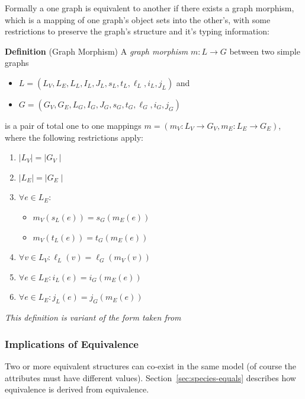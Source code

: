 \documentclass{cekarticle}
\begin{document}
Formally a one graph is equivalent to another if there exists a
graph morphism, which is a mapping of one graph's object sets into
the other's, with some restrictions to preserve the graph's
structure and it's typing information:

\textbf{Definition} (Graph Morphism) A \emph{graph morphism} $m : L \rightarrow G$ between two
simple graphs
\begin{itemize}
\item $L = (L_{V}, L_{E}, L_{L}, I_{L}, J_{L}, s_{L}, t_{L}, \ell_{L}, i_{L}, j_{L})$ and
\item $G = (G_{V}, G_{E}, L_{G}, I_{G}, J_{G}, s_{G}, t_{G}, \ell_{G}, i_{G}, j_{G})$
\end{itemize}
is a pair of total one to one mappings $m = (m_{V} : L_{V}
\rightarrow G_{V}, m_{E} : L_{E} \rightarrow G_{E})$, where the
following restrictions apply:

\begin{enumerate}
\item $\mid L_{V} \mid = \mid G_{V} \mid$

\item $\mid L_{E} \mid = \mid G_{E} \mid$

\item $\forall e \in L_{E} : $
    \begin{itemize}
    \item $m_{V}(s_{L}(e))= s_{G}(m_{E}(e))$
    \item $m_{V}(t_{L}(e))= t_{G}(m_{E}(e))$
    \end{itemize}
\item $\forall v \in L_{V} : \ell_{L}(v) = \ell_{G}(m_{V}(v))$
\item $\forall e \in L_{E} : i_{L}(e) = i_{G}(m_{E}(e))$
\item $\forall e \in L_{E} : j_{L}(e) = j_{G}(m_{E}(e))$
\end{enumerate}

\emph{This definition is variant of the form taken from
\citep{rudolf:1998}}

\subsubsection{Implications of  Equivalence}

Two or more equivalent  structures can co-exist
in the same model (of course the  attributes must have
different values).  Section~\ref{sec:species-equals} describes how
 equivalence is derived from 
equivalence.
\end{document}

